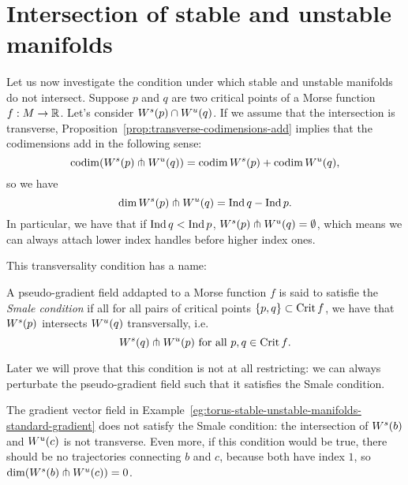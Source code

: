     \\

    \section{Intersection of stable and unstable manifolds}
    Let us now investigate the condition under which stable and unstable manifolds do not intersect.
    Suppose $p$ and $q$ are two critical points of a Morse function $f: M \to  \mathbb{R}$.
    Let's consider $W^s(p) \cap W^u(q)$.
    If we assume that the intersection is transverse, Proposition~\ref{prop:transverse-codimensions-add} implies that the codimensions add in the following sense:
    \[
        \operatorname{codim}(W^s(p) \pitchfork  W^u(q)) = \operatorname{codim} W^s(p) + \operatorname{codim} W^u(q)
    ,\] 
    so we have
    \[
        \dim W^s(p) \pitchfork W^u(q) = \operatorname{Ind} q - \operatorname{Ind} p
    .\]
    In particular, we have that if $\operatorname{Ind} q < \operatorname{Ind} p$,  $W^s(p) \pitchfork W^u(q) = \emptyset$, which means we can always attach lower index handles before higher index ones.



    This transversality condition has a name:
    \begin{definition}
        A pseudo-gradient field addapted to a Morse function $f$ is said to satisfie the \emph{Smale condition} if all for all pairs of critical points $ \{p, q\}  \subset \operatorname{Crit} f$, we have that $W^s(p)$ intersects  $W^u(q)$ transversally, i.e. 
        \[
            W^s(q) \pitchfork  W^u(p) \text{ for all $p, q \in \operatorname{Crit} f$}
        .\] 
    \end{definition}
    Later we will prove that this condition is not at all restricting: we can always perturbate the pseudo-gradient field such that it satisfies the Smale condition.

    \begin{eg}
        The gradient vector field in Example~\ref{eg:torus-stable-unstable-manifolds-standard-gradient} does not satisfy the Smale condition: the intersection of $W^s(b)$ and  $W^u(c)$ is not transverse.
        Even more, if this condition would be true, there should be no trajectories connecting $b$ and $c$, because both have index $1$, so $\dim (W^s(b) \pitchfork W^u(c)) = 0$.
    \end{eg}

